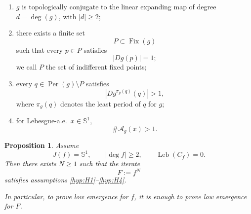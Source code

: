 \documentclass[12pt,a4paper,twoside]{article}
\theoremstyle{plain}
\newtheorem{proposition}[theorem]{Proposition}
\theoremstyle{definition}
\newcommand{\cA}{{\mathcal A}}
\newcommand{\Leb}{\operatorname{Leb}}
\newcommand{\Sone}{\mathbb{S}^1}
\begin{document}
\begin{enumerate}[label=(H\arabic*),ref=H\arabic*]
	\item\label{hyp:H1}
	\(g\) is topologically conjugate to the linear expanding map
	of degree \(d=\deg(g)\), with \(|d|\ge2\);

	\item\label{hyp:H2}
	there exists a finite set
	\[
	P\subset\operatorname{Fix}(g)
	\]
	such that every \(p\in P\) satisfies
	\[
	|Dg(p)|=1;
	\]
	we call \(P\) the set of indifferent fixed points;

	\item\label{hyp:H3}
	every \(q\in\operatorname{Per}(g)\setminus P\) satisfies
	\[
	|Dg^{\pi_g(q)}(q)|>1,
	\]
	where \(\pi_g(q)\) denotes the least period of \(q\) for \(g\);

	\item\label{hyp:H4}
	for Lebesgue-a.e.\ \(x\in\Sone\),
	\[
	\#\cA_g(x)>1.
	\]
\end{enumerate}

\begin{proposition}\label{prop:reduction-finite-neutral}
Assume
\[
J(f)=\Sone,\qquad |\deg f|\ge2,\qquad \Leb(C_f)=0.
\]
Then there exists \(N\ge1\) such that the iterate
\[
F:=f^N
\]
satisfies assumptions \emph{\ref{hyp:H1}--\ref{hyp:H4}}.

In particular, to prove low emergence for \(f\), it is enough to prove
low emergence for \(F\).
\end{proposition}
\end{document}
